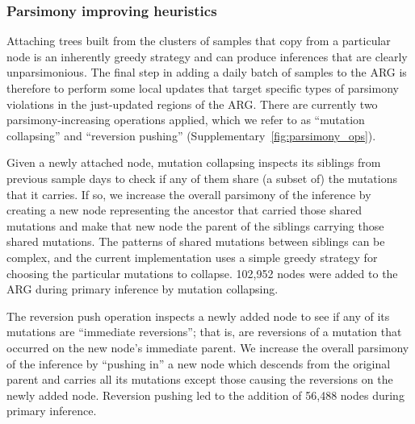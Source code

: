 \documentclass[12pt]{article}
\newcommand{\siref}[1]{Supplementary~\ref{#1}}
\begin{document}
\subsubsection*{Parsimony improving heuristics}
Attaching trees built from the clusters of samples that copy from
a particular node is an inherently greedy strategy
and can produce inferences that are clearly unparsimonious.
The final step in adding a daily batch of samples to the ARG
is therefore to perform some local updates that target specific
types of parsimony violations in the just-updated regions of the
ARG. There are currently two parsimony-increasing operations
applied, which we refer to as ``mutation collapsing'' and ``reversion
pushing'' (\siref{fig:parsimony_ops}).

Given a newly attached node, mutation collapsing inspects its siblings from
previous sample days to check if any of them share (a subset of) the mutations
that
it carries. If so, we increase the overall parsimony of the inference
by creating a new node representing the ancestor that carried
those shared mutations and make that new node the parent of the
siblings carrying those shared mutations.
The patterns of
shared mutations between siblings can be complex, and the current
implementation uses a simple greedy strategy for choosing
the particular mutations to collapse.
102,952 nodes were
added to the ARG during primary inference by mutation collapsing.

The reversion push operation inspects a newly added node to see
if any of its mutations are ``immediate reversions''; that is,
are reversions of a mutation that occurred on the new node's
immediate parent. We increase the overall parsimony of the
inference by ``pushing in'' a new node which descends from the
original parent and carries all its mutations except those
causing the reversions on the newly added node.
Reversion pushing led to the addition of 56,488 nodes during primary inference.
\end{document}
